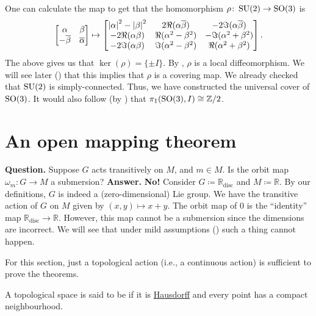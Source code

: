 \documentclass[12pt]{article}
\begin{document}
One can calculate the map to get that the homomorphism $\rho \colon \operatorname{SU}(2) \to \operatorname{SO}(3)$ is
\begin{equation*} 
	\begin{bmatrix} \alpha & \beta \\ -\overline{\beta} & \overline{\alpha} \end{bmatrix} 
	\mapsto
	\begin{bmatrix}
		{\left\lvert \alpha \right\lvert}^{2} - {\left\lvert \beta \right\lvert}^{2} & 2 \Re(\alpha \overline{\beta}) & -2 \Im(\alpha \overline{\beta}) \\
		-2 \Re(\alpha \beta) & \Re(\alpha^{2} - \beta^{2}) & -\Im(\alpha^{2} + \beta^{2}) \\
		-2 \Im(\alpha \beta) & \Im(\alpha^{2} - \beta^{2}) & \Re(\alpha^{2} + \beta^{2}) \\
	\end{bmatrix}.
\end{equation*}
The above gives us that $\ker(\rho) = \{\pm I\}$. 
By , $\rho$ is a local diffeomorphism. 
We will see later () that this implies that $\rho$ is a covering map. 
We already checked that $\operatorname{SU}(2)$ is simply-connected. 
Thus, we have constructed the universal cover of $\operatorname{SO}(3)$. 
It would also follow (by ) that $\pi_{1}(\operatorname{SO}(3), I) \cong \mathbb{Z}/2$.

\section{An open mapping theorem}

\textbf{Question.} Suppose $G$ acts transitively on $M$, and $m \in M$. Is the orbit map $\omega_{m} \colon G \to M$ a submersion? \newline
\textbf{Answer.} {\color{red}\textbf{No!}} Consider $G \coloneqq \mathbb{R}_{\text{disc}}$ and $M \coloneqq \mathbb{R}$. 
By our definitions, $G$ is indeed a (zero-dimensional) Lie group. \newline
We have the transitive action of $G$ on $M$ given by $(x, y) \mapsto x + y$. 
The orbit map of $0$ is the ``identity'' map $\mathbb{R}_{\text{disc}} \to \mathbb{R}$. 
However, this map cannot be a submersion since the dimensions are incorrect. \newline
We will see that under mild assumptions () such a thing cannot happen.

For this section, just a topological action (i.e., a continuous action) is sufficient to prove the theorems.

\begin{defn}
	A topological space is said to be  if it is \underline{Hausdorff} and every point has a compact neighbourhood.
\end{defn}
\end{document}
